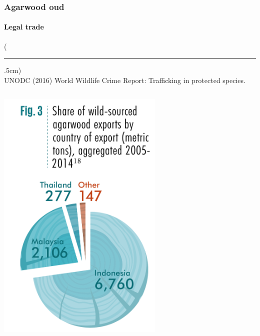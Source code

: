 \documentclass[10pt]{beamer}
\newenvironment{reference}[2]{%
	\begin{textblock*}{\textwidth}(#1,#2)
		\tiny\bgroup\color{gray}}{\egroup\end{textblock*}}
\begin{document}
\begin{frame}[t]
\frametitle{Agarwood oud}
\framesubtitle{Legal trade}
\vspace{0.5cm}

	\begin{reference}{4mm}{92mm}
		\rule{1.5cm}{0.25pt}\\
		UNODC (2016) World Wildlife Crime Report: Trafficking in protected species.
	\end{reference}

	\begin{columns}
		\begin{column}{0.5\textwidth}
			\begin{center}
				\includegraphics[width=0.6\textwidth]{figures/agarwood_legal_export.png}
			\end{center}
		\end{column}
		

\end{columns}
\end{frame}
\end{document}
